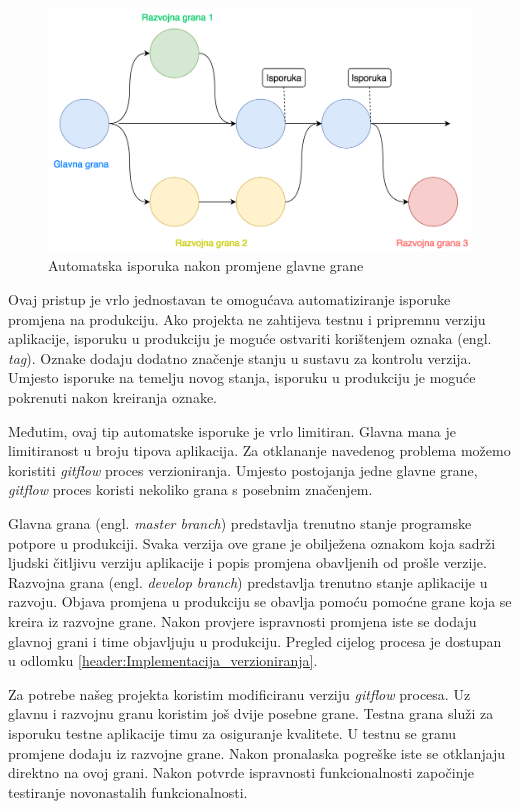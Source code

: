 \documentclass[times, utf8, diplomski, numeric]{fer}
\newcommand{\eng}[1]{(engl. \textit{#1})}
\begin{document}
\begin{figure}
\centering
\includegraphics[scale=0.5]{FeatureBranchCD}
\caption{Automatska isporuka nakon promjene glavne grane}
\label{fig:FeatureBranchCD}
\end{figure}

Ovaj pristup je vrlo jednostavan te omogućava automatiziranje isporuke promjena na produkciju. Ako projekta ne zahtijeva testnu i pripremnu verziju aplikacije, isporuku u produkciju je moguće ostvariti korištenjem oznaka \eng{tag}. Oznake dodaju dodatno značenje stanju u sustavu za kontrolu verzija. Umjesto isporuke na temelju novog stanja, isporuku u produkciju je moguće pokrenuti nakon kreiranja oznake.

Međutim, ovaj tip automatske isporuke je vrlo limitiran. Glavna mana je limitiranost u broju tipova aplikacija. Za otklananje navedenog problema možemo koristiti \textit{gitflow} proces verzioniranja. Umjesto postojanja jedne glavne grane, \textit{gitflow} proces koristi nekoliko grana s posebnim značenjem.

Glavna grana \eng{master branch} predstavlja trenutno stanje programske potpore u produkciji. Svaka verzija ove grane je obilježena oznakom koja sadrži ljudski čitljivu verziju aplikacije i popis promjena obavljenih od prošle verzije. Razvojna grana \eng{develop branch} predstavlja trenutno stanje aplikacije u razvoju. Objava promjena u produkciju se obavlja pomoću pomoćne grane koja se kreira iz razvojne grane. Nakon provjere ispravnosti promjena iste se dodaju glavnoj grani i time objavljuju u produkciju. Pregled cijelog procesa je dostupan u odlomku \ref{header:Implementacija_verzioniranja}.

Za potrebe našeg projekta koristim modificiranu verziju \textit{gitflow} procesa. Uz glavnu i razvojnu granu koristim još dvije posebne grane. Testna grana služi za isporuku testne aplikacije timu za osiguranje kvalitete. U testnu se granu promjene dodaju iz razvojne grane. Nakon pronalaska pogreške iste se otklanjaju direktno na ovoj grani. Nakon potvrde ispravnosti funkcionalnosti započinje testiranje novonastalih funkcionalnosti.
\end{document}
